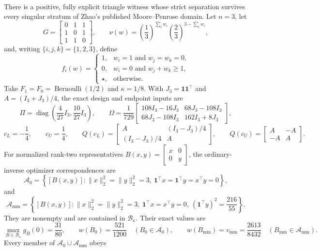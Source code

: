 There is a positive, fully explicit triangle witness whose strict separation survives every singular stratum of Zhao's published Moore--Penrose domain.  Let \(n=3\), let
\[
G=\begin{bmatrix}0&1&1\\1&0&1\\1&1&0\end{bmatrix},
\qquad
\nu(w)=\left(\frac13\right)^{\sum_iw_i}
       \left(\frac23\right)^{3-\sum_iw_i},
\]
and, writing \(\{i,j,k\}=\{1,2,3\}\), define
\[
f_i(w)=
\begin{cases}
1,&w_i=1\text{ and }w_j=w_k=0,\\
0,&w_i=0\text{ and }w_j+w_k\ge1,\\
\star,&\text{otherwise}.
\end{cases}
\]
Take \(F_1=F_0=\operatorname{Bernoulli}(1/2)\) and \(\kappa=1/8\).  With \(J_3=\mathbf1\mathbf1^{\top}\) and \(A=(I_3+J_3)/4\), the exact design and endpoint inputs are
\[
\Pi=\operatorname{diag}\!\left(\frac4{27}I_3,\frac{10}{27}I_3\right),
\qquad
\Omega=\frac1{729}
\begin{bmatrix}
108I_3-16J_3&68J_3-108I_3\\
68J_3-108I_3&162I_3+8J_3
\end{bmatrix},
\]
\[
c_L=-\frac14,
\qquad c_U=\frac14,
\qquad
Q(c_L)=
\begin{bmatrix}A&(I_3-J_3)/4\\(I_3-J_3)/4&A\end{bmatrix},
\qquad
Q(c_U)=
\begin{bmatrix}A&-A\\-A&A\end{bmatrix}.
\]
For normalized rank-two representatives \(B(x,y)=\begin{bmatrix}x&0\\0&y\end{bmatrix}\), the ordinary-inverse optimizer correspondences are
\[
\mathcal A_0=
\left\{[B(x,y)]:
\lVert x\rVert_2^2=\lVert y\rVert_2^2=3,\ 
\mathbf1^{\top}x=\mathbf1^{\top}y=x^{\top}y=0
\right\},
\]
and
\[
\mathcal A_{\mathrm{mm}}=
\left\{[B(x,y)]:
\lVert x\rVert_2^2=\lVert y\rVert_2^2=3,\ 
\mathbf1^{\top}x=x^{\top}y=0,\ 
(\mathbf1^{\top}y)^2=\frac{216}{55}
\right\}.
\]
They are nonempty and are contained in \(\mathcal B_\kappa\).  Their exact values are
\[
\max_{B\in\mathcal B_\kappa}g_B(0)=\frac{31}{80},
\qquad
w(B_0)=\frac{521}{1200}\quad(B_0\in\mathcal A_0),
\qquad
w(B_{\mathrm{mm}})=v_{\mathrm{mm}}=\frac{2613}{8432}
\quad(B_{\mathrm{mm}}\in\mathcal A_{\mathrm{mm}}).
\]
Every member of \(\mathcal A_0\cup\mathcal A_{\mathrm{mm}}\) obeys
